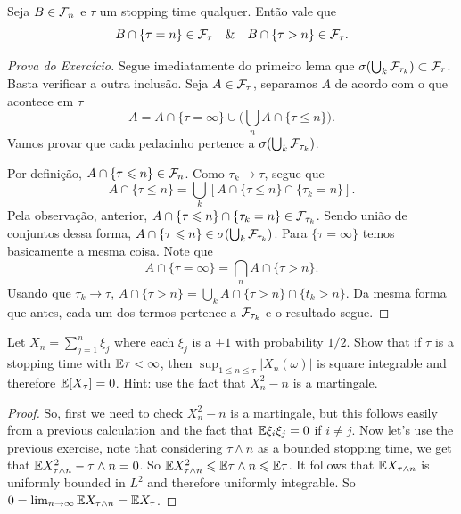 \begin{obs}
	Seja $B \in \mathcal{F}_n$ e $\tau$ um stopping time qualquer. Então vale que
	\[
		B \cap \{\tau = n\} \in \mathcal{F}_{\tau} \quad \& \quad B \cap \{\tau >
		n\} \in \mathcal{F}_{\tau}.
	\]
\end{obs}

\begin{proof}[Prova do Exercício]
	Segue imediatamente do primeiro lema que $\sigma(\bigcup_{k}
	\mathcal{F}_{\tau_k}) \subset \mathcal{F}_{\tau}$.
	Basta verificar a outra inclusão.
	Seja $A \in \mathcal{F}_{\tau}$, separamos $A$ de acordo com o que acontece em $\tau$
	\[A = A \cap \{\tau = \infty\} \cup \bigg( \bigcup_{n} A \cap \{\tau
	\leq n\} \bigg).\]
	Vamos provar que cada pedacinho pertence a $\sigma(\bigcup_{k} \mathcal{F}_{\tau_k})$.

	Por definição, $A \cap \{\tau \leqslant n\} \in \mathcal{F}_n$. Como $\tau_k \to
	\tau$, segue que
	\[
		A \cap \{\tau \leq n\} = \bigcup_{k} [A \cap \{\tau \leq n\} \cap
		\{\tau_k = n\}].
	\]
	Pela observação, anterior, $A \cap \{\tau \leqslant n\} \cap \{\tau_k =
	n\} \in \mathcal{F}_{\tau_k}$.
	Sendo união de conjuntos dessa forma, $A \cap \{\tau \leqslant n\} \in
	\sigma(\bigcup_k \mathcal{F}_{\tau_k})$. Para $\{\tau = \infty\}$ temos
	basicamente a mesma coisa. Note que
	\[
		A \cap \{\tau = \infty\} = \bigcap_n A \cap \{\tau > n\}.
	\]
	Usando que $\tau_k \to \tau$,
	$A \cap \{\tau > n\} = \bigcup_k A \cap \{\tau > n\} \cap \{t_k > n\}$.
	Da mesma forma que antes, cada um dos termos pertence a
	$\mathcal{F}_{\tau_k}$ e o resultado segue.
\end{proof}

\begin{exercise}
	Let $X_n = \sum_{j=1}^n \xi_j$ where each $\xi_j$ is a $\pm 1$ with
	probability $1/2$.
	Show that if $\tau$ is a stopping time with $\mathbb{E} \tau < \infty$, then
	$\sup_{1 \leq n \leq \tau} |X_n(\omega)|$ is square integrable and
	therefore $\mathbb{E}[X_\tau] = 0$.
	Hint: use the fact that $X_n^2 - n$ is a martingale.
\end{exercise}

\begin{proof}
	So, first we need to check $X_{n}^2 - n$ is a martingale, but this
	follows easily from
	a previous calculation and the fact that $\mathbb{E} \xi_i \xi_j = 0$ if $i \neq j$.
	Now let's use the previous exercise, note that considering $\tau
	\land n$ as a bounded stopping time,
	we get that $\mathbb{E} X_{\tau \land n}^2 - \tau \land n = 0$. So $\mathbb{E}
	X_{\tau \land n}^2 \leqslant \mathbb{E} \tau \land n \leqslant \mathbb{E} \tau$.
	It follows that $\mathbb{E} X_{\tau \land n}$ is uniformly bounded in
	$L^2$ and therefore uniformly
	integrable. So $0 = \lim_{n \rightarrow \infty }\mathbb{E} X_{\tau \land n} = \mathbb{E} X_{\tau}$.
\end{proof}

